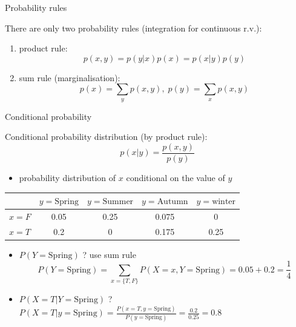 \documentclass[ignorenonframetext,]{beamer}
\providecommand{\tightlist}{%
  \setlength{\itemsep}{0pt}\setlength{\parskip}{0pt}}
\begin{document}
\begin{frame}{Probability rules}
\protect\hypertarget{probability-rules}{}

There are only two probability rules (integration for continuous r.v.):

\begin{enumerate}
    \item product rule: \[ p(x, y) = p (y|x)p(x) = p(x|y)p(y)\]
    \item sum rule (marginalisation): \[ p (x) = \sum_y p(x, y),\; p(y) = \sum_x p(x, y)\]
\end{enumerate}

\end{frame}

\begin{frame}{Conditional probability}
\protect\hypertarget{conditional-probability}{}

Conditional probability distribution (by product rule):
\[p (x| y) = \frac{p(x, y)}{p(y)}\]

\begin{itemize}
\tightlist
\item
  probability distribution of \(x\) conditional on the value of \(y\)
\end{itemize}

\bigskip

\begin{table}\centering
\begin{tabular}{ l | c | c | c | c}
   \centering                    
   & $y=\text{Spring}$ & $y=\text{Summer}$ &$y=\text{Autumn}$ & $y=\text{winter}$\\ 
   \hline
  $x= F$ & 0.05 & 0.25 & 0.075& 0\\
    \hline 
  $x= T$ & 0.2 & 0 & 0.175& 0.25\\ 
\end{tabular}
\end{table}

\bigskip

\begin{itemize}
\item
  \(P(Y= \text{Spring})\) ? use sum rule
  \[P(Y = \text{Spring}) = \sum_{x=\{T,F\}} P(X=x,Y=\text{Spring}) =0.05+0.2=\frac{1}{4}\]
\item
  \(P(X=T | Y= \text{Spring})\) ?
  \(P(X=T | y = \text{Spring}) = \frac{P(x=T, y=\text{Spring})}{P(y=\text{Spring})}=\frac{0.2}{0.25}=0.8\)
\end{itemize}

\end{frame}
\end{document}
